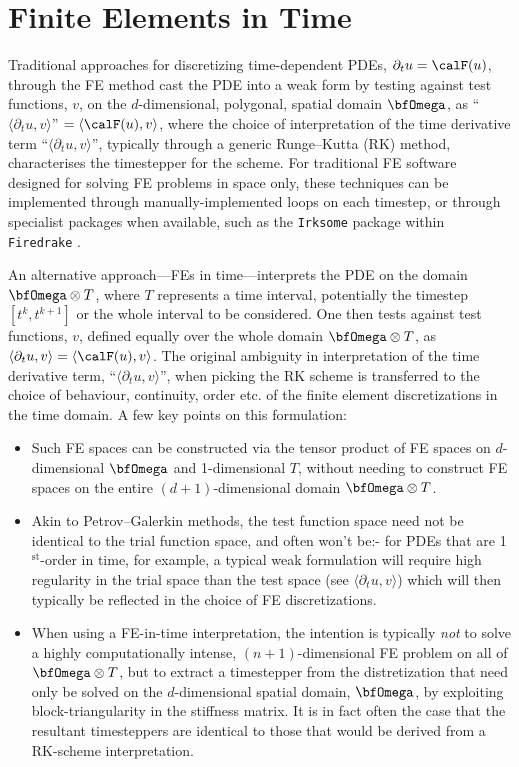 \chapter{Finite Elements in Time}\label{cha:finite elements in time}

    Traditional approaches for discretizing time-dependent PDEs, $\partial_{t}u  =  \calF(u)$, through the FE method cast the PDE into a weak form by testing against test functions, $v$, on the $d$-dimensional, polygonal, spatial domain $\bfOmega$, as ``$\langle\partial_{t}u, v\rangle$''  $=  \langle\calF(u), v\rangle$, where the choice of interpretation of the time derivative term ``$\langle\partial_{t}u, v\rangle$'', typically through a generic Runge–Kutta (RK) method, characterises the timestepper for the scheme. For traditional FE software designed for solving FE problems in space only, these techniques can be implemented through manually-implemented loops on each timestep, or through specialist packages when available, such as the \texttt{Irksome} package within \texttt{Firedrake} \BA{[Ref]}.

    An alternative approach—FEs in time—interprets the PDE on the domain $\bfOmega\otimes T$, where $T$ represents a time interval, potentially the timestep $\left[t^{k}, t^{k + 1}\right]$ or the whole interval to be considered. One then tests against test functions, $v$, defined equally over the whole domain $\bfOmega\otimes T$, as $\langle\partial_{t}u, v\rangle  =  \langle\calF(u), v\rangle$. The original ambiguity in interpretation of the time derivative term, ``$\langle\partial_{t}u, v\rangle$'', when picking the RK scheme is transferred to the choice of behaviour, continuity, order etc. of the finite element discretizations in the time domain. A few key points on this formulation:
    \begin{itemize}
        \item  Such FE spaces can be constructed via the tensor product of FE spaces on $d$-dimensional $\bfOmega$ and 1-dimensional $T$, without needing to construct FE spaces on the entire $(d + 1)$-dimensional domain $\bfOmega\otimes T$.
        \item  Akin to Petrov–Galerkin methods, the test function space need not be identical to the trial function space, and often won't be:- for PDEs that are 1$^{\text{st}}$-order in time, for example, a typical weak formulation will require high regularity in the trial space than the test space (see $\langle\partial_{t}u, v\rangle$) which will then typically be reflected in the choice of FE discretizations.
        \item  When using a FE-in-time interpretation, the intention is typically \emph{not} to solve a highly computationally intense, $(n + 1)$-dimensional FE problem on all of $\bfOmega\otimes T$, but to extract a timestepper from the distretization that need only be solved on the $d$-dimensional spatial domain, $\bfOmega$, by exploiting block-triangularity in the stiffness  matrix. It is in fact often the case that the resultant timesteppers are identical to those that would be derived from a RK-scheme interpretation.
    \end{itemize}

